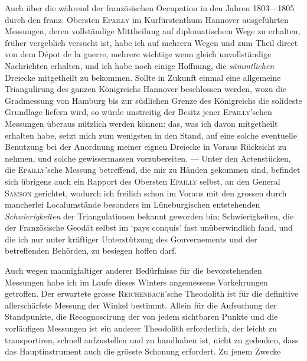 Auch über die während der französischen Occupation in den Jahren 1803—1805 durch den franz. Obersten \textsc{Epailly} im Kurfürstenthum Hannover ausgeführten Messungen, deren vollständige Mittheilung auf diplomatischem Wege zu erhalten, früher vergeblich versucht ist, habe ich auf mehrern Wegen und zum Theil direct von dem Dépot de la guerre, mehrere wichtige wenn gleich unvollständige Nachrichten erhalten, und ich habe noch einige Hoffnung, die \textit{sämmtlichen} Dreiecke mitgetheilt zu bekommen. Sollte in Zukunft einmal eine allgemeine Triangulirung des ganzen Königreichs Hannover beschlossen werden, wozu die Gradmessung von Hamburg bis zur südlichen Grenze des Königreichs die solideste Grundlage liefern wird, so würde unstreitig der Besitz jener \textsc{Epailly}'schen Messungen überaus nützlich werden können: das, was ich davon mitgetheilt erhalten habe, setzt mich zum wenigsten in den Stand, auf eine solche eventuelle Benutzung bei der Anordnung meiner eignen Dreiecke in Voraus Rücksicht zu nehmen, und solche gewissermassen vorzubereiten. — Unter den Actenstücken, die \textsc{Epailly}'sche Messung betreffend, die mir zu Händen gekommen sind, befindet sich übrigens auch ein Rapport des Obersten \textsc{Epailly} selbst, an den General \textsc{Samson} gerichtet, wodurch ich freilich schon im Voraus mit den grossen durch mancherlei Localumstände besonders im Lüneburgischen entstehenden \textit{Schwierigkeiten} der Triangulationen bekannt geworden bin; Schwierigkeiten, die der Französische Geodät selbst im ‘pays conquis’ fast unüberwindlich fand, und die ich nur unter kräftiger Unterstützung des Gouvernements und der betreffenden Behörden, zu besiegen hoffen darf.

Auch wegen mannigfaltiger anderer Bedürfnisse für die bevorstehenden Messungen habe ich im Laufe dieses Winters angemessene Vorkehrungen getroffen. Der erwartete grosse \textsc{Reichenbach}'sche Theodolith ist für die definitive allerschärfste Messung der Winkel bestimmt. Allein für die Aufsuchung der Standpunkte, die Recognoscirung der von jedem sichtbaren Punkte und die vorläufigen Messungen ist ein anderer Theodolith erforderlich, der leicht zu transportiren, schnell aufzustellen und zu handhaben ist, nicht zu gedenken, dass das Hauptinstrument auch die grösste Schonung erfordert. Zu jenem Zwecke
